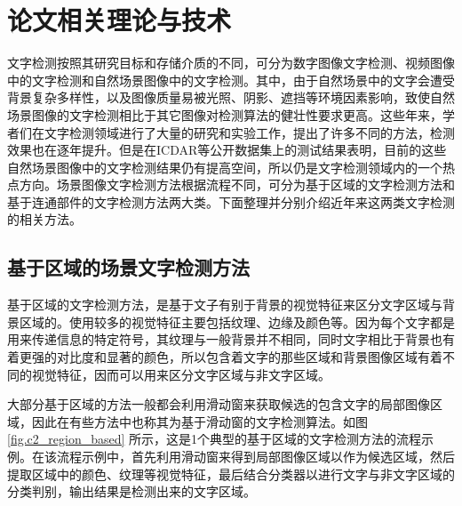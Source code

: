 ﻿%
%
%
%
%
%

\chapter{论文相关理论与技术}

    文字检测按照其研究目标和存储介质的不同，可分为数字图像文字检测、视频图像中的文字检测和自然场景图像中的文字检测。其中，由于自然场景中的文字会遭受背景复杂多样性，以及图像质量易被光照、阴影、遮挡等环境因素影响，致使自然场景图像的文字检测相比于其它图像对检测算法的健壮性要求更高。这些年来，学者们在文字检测领域进行了大量的研究和实验工作，提出了许多不同的方法，检测效果也在逐年提升。但是在ICDAR等公开数据集上的测试结果表明，目前的这些自然场景图像中的文字检测结果仍有提高空间，所以仍是文字检测领域内的一个热点方向。场景图像文字检测方法根据流程不同，可分为基于区域的文字检测方法和基于连通部件的文字检测方法两大类。下面整理并分别介绍近年来这两类文字检测的相关方法。

    \section{基于区域的场景文字检测方法}

    基于区域的文字检测方法，是基于文子有别于背景的视觉特征来区分文字区域与背景区域的。使用较多的视觉特征主要包括纹理、边缘及颜色等。因为每个文字都是用来传递信息的特定符号，其纹理与一般背景并不相同，同时文字相比于背景也有着更强的对比度和显著的颜色，所以包含着文字的那些区域和背景图像区域有着不同的视觉特征，因而可以用来区分文字区域与非文字区域。

    大部分基于区域的方法一般都会利用滑动窗来获取候选的包含文字的局部图像区域，因此在有些方法中也称其为基于滑动窗的文字检测算法。如图\ref{fig.c2_region_based} 所示，这是1个典型的基于区域的文字检测方法的流程示例。在该流程示例中，首先利用滑动窗来得到局部图像区域以作为候选区域，然后提取区域中的颜色、纹理等视觉特征，最后结合分类器以进行文字与非文字区域的分类判别，输出结果是检测出来的文字区域。

